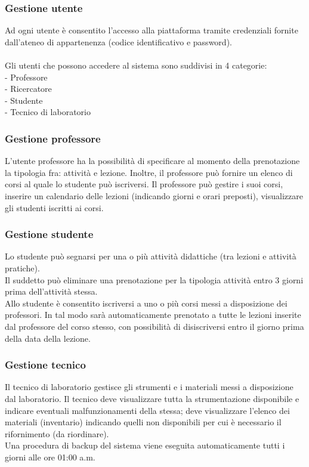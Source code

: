 \documentclass[11pt,a4paper]{report}
\begin{document}
\subsubsection{Gestione utente }
Ad ogni utente è consentito l’accesso alla piattaforma tramite credenziali fornite dall’ateneo di appartenenza (codice identificativo e password). \\\\
Gli utenti che possono accedere al sistema sono suddivisi in 4 categorie:\\
-	Professore\\
-	Ricercatore\\
-	Studente\\
-	Tecnico di laboratorio
\subsubsection{Gestione professore}
L’utente professore ha la possibilità di specificare al momento della prenotazione la tipologia fra: attività e lezione. Inoltre, il professore può fornire un elenco di corsi al quale lo studente può iscriversi. Il professore può gestire i suoi corsi, inserire un calendario delle lezioni (indicando giorni e orari preposti), visualizzare gli studenti iscritti ai corsi. 
\subsubsection{Gestione studente}
Lo studente può segnarsi per una o più attività didattiche (tra lezioni e attività pratiche).\\
Il suddetto può eliminare una prenotazione per la tipologia attività entro 3 giorni prima dell’attività stessa. \\
Allo studente è consentito iscriversi a uno o più corsi messi a disposizione dei professori. In tal modo sarà automaticamente prenotato a tutte le lezioni inserite dal professore del corso stesso, con possibilità di disiscriversi entro il giorno prima della data della lezione. 
\subsubsection{Gestione tecnico}
Il tecnico di laboratorio gestisce gli strumenti e i materiali messi a disposizione dal laboratorio. Il tecnico deve visualizzare tutta la strumentazione disponibile e indicare eventuali malfunzionamenti della stessa; deve visualizzare l’elenco dei materiali (inventario) indicando quelli non disponibili per cui è necessario il rifornimento (da riordinare).
\vspace{1em} \\ Una procedura di backup del sistema viene eseguita automaticamente tutti i giorni alle ore 01:00 a.m. 
\end{document}
